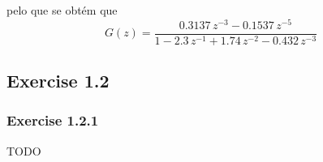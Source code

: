 \documentclass[a4paper]{article}
\begin{document}
\noindent pelo que se obtém que
\begin{equation}
	G(z) = \frac{0.3137 \, z^{-3} - 0.1537 \, z^{-5}}{1 - 2.3 \, z^{-1} + 1.74 \, z^{-2} - 0.432 \, z^{-3}}
\end{equation}

\subsection{Exercise 1.2}
\subsubsection{Exercise 1.2.1}
TODO


\end{document}
